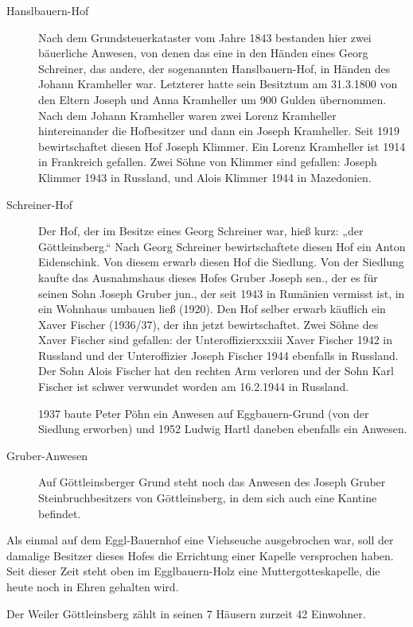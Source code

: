 \documentclass[12pt,a4pager,draft]{book}
\begin{document}
\begin{description}
\item[Hanslbauern-Hof] Nach dem Grundsteuerkataster vom Jahre 1843 bestanden
hier zwei bäuerliche Anwesen, von denen das eine in den Händen eines Georg
Schreiner, das andere, der sogenannten Hanslbauern-Hof, in Händen des Johann
Kramheller war. Letzterer hatte sein Besitztum am 31.3.1800 von den Eltern
Joseph und Anna Kramheller um 900 Gulden übernommen. Nach dem Johann Kramheller
waren zwei Lorenz Kramheller hintereinander die Hofbesitzer und dann ein Joseph
Kramheller. Seit 1919 bewirtschaftet diesen Hof Joseph Klimmer. Ein Lorenz
Kramheller ist 1914 in Frankreich gefallen. Zwei Söhne von Klimmer sind
gefallen: Joseph Klimmer 1943 in Russland, und Alois Klimmer 1944 in Mazedonien.

\item[Schreiner-Hof] Der Hof, der im Besitze eines Georg Schreiner war, hieß
kurz: „der Göttleinsberg.“ Nach Georg Schreiner bewirtschaftete diesen Hof ein
Anton Eidenschink. Von diesem erwarb diesen Hof die Siedlung. Von der Siedlung
kaufte das Ausnahmshaus dieses Hofes Gruber Joseph sen., der es für seinen Sohn
Joseph Gruber jun., der seit 1943 in Rumänien vermisst ist, in ein Wohnhaus
umbauen ließ (1920). Den Hof selber erwarb käuflich ein Xaver Fischer (1936/37),
der ihn jetzt bewirtschaftet. Zwei Söhne des Xaver Fischer sind gefallen: der
Unteroffizierxxxiii Xaver Fischer 1942 in Russland und der Unteroffizier Joseph
Fischer 1944 ebenfalls in Russland. Der Sohn Alois Fischer hat den rechten Arm
verloren und der Sohn Karl Fischer ist schwer verwundet worden am 16.2.1944 in
Russland.

1937 baute Peter Pöhn ein Anwesen auf Eggbauern-Grund (von der Siedlung
erworben) und 1952 Ludwig Hartl daneben ebenfalls ein Anwesen.

\item[Gruber-Anwesen] Auf Göttleinsberger Grund steht noch das Anwesen des
Joseph Gruber Steinbruchbesitzers von Göttleinsberg, in dem sich auch eine
Kantine befindet.
\end{description}

Als einmal auf dem Eggl-Bauernhof eine Viehseuche ausgebrochen war, soll der
damalige Besitzer dieses Hofes die Errichtung einer Kapelle versprochen haben.
Seit dieser Zeit steht oben im Egglbauern-Holz eine Muttergotteskapelle, die
heute noch in Ehren gehalten wird.

Der Weiler Göttleinsberg zählt in seinen 7 Häusern zurzeit 42 Einwohner.
\end{document}
